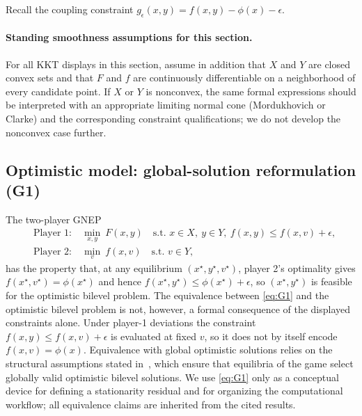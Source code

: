 \documentclass[11pt]{article}
\theoremstyle{definition}
\newcommand{\eps}{\epsilon}
\begin{document}
Recall the coupling constraint
$g_\eps(x,y)=f(x,y)-\phi(x)-\eps$.

\paragraph{Standing smoothness assumptions for this section.}
For all KKT displays in this section, assume in addition that $X$
and $Y$ are closed convex sets and that $F$ and $f$ are
continuously differentiable on a neighborhood of every candidate
point. If $X$ or $Y$ is nonconvex, the same formal expressions
should be interpreted with an appropriate limiting normal cone
(Mordukhovich or Clarke) and the corresponding constraint
qualifications; we do not develop the nonconvex case further.

\subsection{Optimistic model: global-solution reformulation (G1)}
\label{sec:G1}
The two-player GNEP
\begin{equation}\tag{G1}\label{eq:G1}
\begin{aligned}
  &\text{Player 1:}\quad \min_{x,y}\ F(x,y)
  \quad \text{s.t. } x\in X,\ y\in Y,\ f(x,y)\le f(x,v)+\eps,\\
  &\text{Player 2:}\quad \min_{v}\ f(x,v)
  \quad \text{s.t. } v\in Y,
\end{aligned}
\end{equation}
has the property that, at any equilibrium
$(x^\star,y^\star,v^\star)$, player 2's optimality gives
$f(x^\star,v^\star)=\phi(x^\star)$ and hence
$f(x^\star,y^\star)\le\phi(x^\star)+\eps$, so
$(x^\star,y^\star)$ is feasible for the optimistic bilevel
problem. The equivalence between \eqref{eq:G1} and the optimistic
bilevel problem is not, however, a formal consequence of the
displayed constraints alone. Under player-1 deviations the
constraint $f(x,y)\le f(x,v)+\eps$ is evaluated at fixed $v$, so
it does not by itself encode $f(x,v)=\phi(x)$. Equivalence with
global optimistic solutions relies on the structural assumptions
stated in~\cite{lampariello2017bridge}, which ensure that
equilibria of the game select globally valid optimistic bilevel
solutions. We use \eqref{eq:G1} only as a conceptual device for
defining a stationarity residual and for organizing the
computational workflow; all equivalence claims are inherited from
the cited results.
\end{document}
